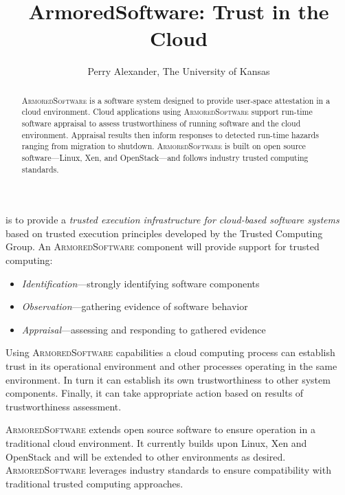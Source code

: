\documentclass{tufte-handout}
\title{ArmoredSoftware: Trust in the Cloud}
\author{Perry Alexander, The University of Kansas}
\begin{document}
\maketitle

\begin{abstract}
  \textsc{ArmoredSoftware} is a software system designed to provide
  user-space attestation in a cloud environment.  Cloud applications
  using \textsc{ArmoredSoftware} support run-time software appraisal
  to assess trustworthiness of running software and the cloud
  environment.  Appraisal results then inform responses to detected
  run-time hazards ranging from migration to shutdown.
  \textsc{ArmoredSoftware} is built on open source software---Linux,
  Xen, and OpenStack---and follows industry trusted computing
  standards.
\end{abstract}


 is to provide a
\emph{trusted execution infrastructure for cloud-based software
  systems} based on trusted execution principles developed by the
Trusted Computing Group.  An \textsc{ArmoredSoftware} component will
provide support for trusted computing:

\begin{itemize}
  \parskip=0pt\itemsep=0pt
\item \emph{Identification}---strongly identifying software components
\item \emph{Observation}---gathering evidence of software behavior
\item \emph{Appraisal}---assessing and responding to gathered evidence
\end{itemize}

Using \textsc{ArmoredSoftware} capabilities a cloud computing process
can establish trust in its operational environment and other processes
operating in the same environment.  In turn it can establish its own
trustworthiness to other system components.  Finally, it can take
appropriate action based on results of trustworthiness assessment.

\textsc{ArmoredSoftware} extends open source software to ensure
operation in a traditional cloud environment.  It currently builds
upon Linux, Xen and OpenStack and will be extended to other
environments as desired.  \textsc{ArmoredSoftware} leverages industry
standards to ensure compatibility with traditional trusted computing
approaches.
\end{document}
